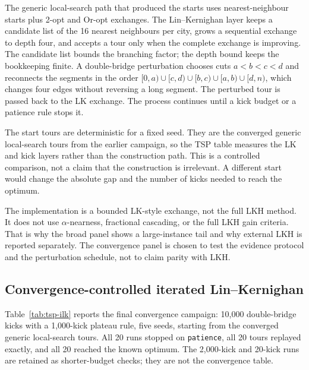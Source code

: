 \documentclass[11pt]{article}
\begin{document}
The generic local-search path that produced the starts uses nearest-neighbour starts plus 2-opt and
Or-opt exchanges. The Lin--Kernighan layer keeps a candidate list of the 16 nearest neighbours per city, grows a sequential
exchange to depth four, and accepts a tour only when the complete exchange is improving. The
candidate list bounds the branching factor; the depth bound keeps the bookkeeping finite. A
double-bridge perturbation chooses cuts $a<b<c<d$ and reconnects the segments in the order
$[0,a)\cup[c,d)\cup[b,c)\cup[a,b)\cup[d,n)$, which changes four edges without reversing a long
segment. The perturbed tour is passed back to the LK exchange. The process continues until a kick
budget or a patience rule stops it.

The start tours are deterministic for a fixed seed. They are the converged generic local-search
tours from the earlier campaign, so the TSP table measures the LK and kick layers rather than the
construction path. This is a controlled comparison, not a claim that the
construction is irrelevant. A different start would change the absolute gap and the number of kicks
needed to reach the optimum.

The implementation is a bounded LK-style exchange, not the full LKH method. It does not use
$\alpha$-nearness, fractional cascading, or the full LKH gain criteria. That is why the broad panel
shows a large-instance tail and why external LKH is reported separately. The convergence panel is
chosen to test the evidence protocol and the perturbation schedule, not to claim parity with LKH.

\subsection{Convergence-controlled iterated Lin--Kernighan}

Table~\ref{tab:tsp-ilk} reports the final convergence campaign: 10,000 double-bridge kicks with a
1,000-kick plateau rule, five seeds, starting from the converged generic local-search tours. All 20 runs stopped on
\texttt{patience}, all 20 tours replayed exactly, and all 20 reached the known optimum. The 2,000-kick
and 20-kick runs are retained as shorter-budget checks; they are not the convergence table.
\end{document}
